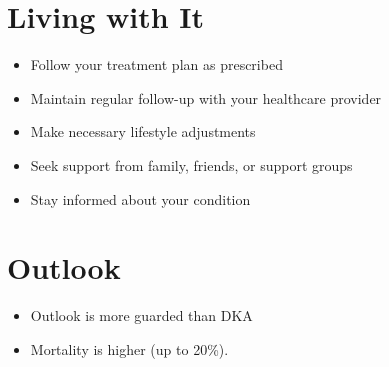\section{Living with It}
\begin{itemize}[noitemsep]
  \item Follow your treatment plan as prescribed
  \item Maintain regular follow-up with your healthcare provider
  \item Make necessary lifestyle adjustments
  \item Seek support from family, friends, or support groups
  \item Stay informed about your condition
\end{itemize}
\section{Outlook}
\begin{itemize}[noitemsep]
  \item Outlook is more guarded than DKA
  \item Mortality is higher (up to 20\%).
\end{itemize}
